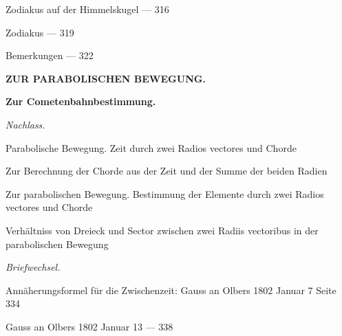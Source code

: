 \documentclass[10pt,a4paper]{article}
\newenvironment{hangparas}[2]{\setlength{\hangindent}{#1}\setlength{\hangafter}{#2}}{}
\begin{document}
\vspace{0.2em}

\begin{hangparas}{1em}{1}
\noindent Zodiakus auf der Himmelskugel \hfill --- 316

\noindent Zodiakus \hfill --- 319
\end{hangparas}

\vspace{0.3em}

\noindent Bemerkungen \hfill --- 322

\vspace{1em}

\begin{center}
\textbf{ZUR PARABOLISCHEN BEWEGUNG.}
\end{center}

\vspace{0.3em}

\noindent\textbf{Zur Cometenbahnbestimmung.}

\vspace{0.2em}

\noindent\textit{Nachlass.}

\vspace{0.2em}

\begin{hangparas}{1em}{1}
\noindent Parabolische Bewegung. Zeit durch zwei Radios vectores und Chorde

\noindent Zur Berechnung der Chorde aus der Zeit und der Summe der beiden Radien

\noindent Zur parabolischen Bewegung. Bestimmung der Elemente durch zwei Radios vectores und Chorde

\noindent Verhältniss von Dreieck und Sector zwischen zwei Radiis vectoribus in der parabolischen Bewegung
\end{hangparas}

\vspace{0.3em}

\noindent\textit{Briefwechsel.}

\vspace{0.2em}

\begin{hangparas}{1em}{1}
\noindent Annäherungsformel für die Zwischenzeit: Gauss an Olbers 1802 Januar 7 \hfill Seite 334

\noindent Gauss an Olbers 1802 Januar 13 \hfill --- 338
\end{hangparas}

\vspace{0.2em}
\end{document}
